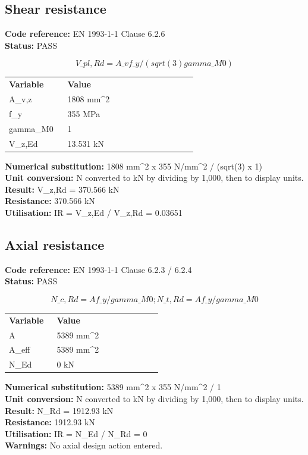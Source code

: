 \documentclass[11pt,a4paper]{article}
\begin{document}
\subsection{Shear resistance}
\textbf{Code reference:} EN 1993-1-1 Clause 6.2.6\\
\textbf{Status:} PASS

\[
V\_pl,Rd = A\_v f\_y / (sqrt(3) gamma\_M0)
\]

\begin{longtable}{p{0.28\linewidth}p{0.62\linewidth}}
\textbf{Variable} & \textbf{Value} \\
A\_v,z & 1808 mm\textasciicircum{}2 \\
f\_y & 355 MPa \\
gamma\_M0 & 1 \\
V\_z,Ed & 13.531 kN \\
\end{longtable}

\textbf{Numerical substitution:} 1808 mm\textasciicircum{}2 x 355 N/mm\textasciicircum{}2 / (sqrt(3) x 1)\\
\textbf{Unit conversion:} N converted to kN by dividing by 1,000, then to display units.\\
\textbf{Result:} V\_z,Rd = 370.566 kN\\
\textbf{Resistance:} 370.566 kN\\
\textbf{Utilisation:} IR = V\_z,Ed / V\_z,Rd = 0.03651\\


\subsection{Axial resistance}
\textbf{Code reference:} EN 1993-1-1 Clause 6.2.3 / 6.2.4\\
\textbf{Status:} PASS

\[
N\_c,Rd = A f\_y / gamma\_M0; N\_t,Rd = A f\_y / gamma\_M0
\]

\begin{longtable}{p{0.28\linewidth}p{0.62\linewidth}}
\textbf{Variable} & \textbf{Value} \\
A & 5389 mm\textasciicircum{}2 \\
A\_eff & 5389 mm\textasciicircum{}2 \\
N\_Ed & 0 kN \\
\end{longtable}

\textbf{Numerical substitution:} 5389 mm\textasciicircum{}2 x 355 N/mm\textasciicircum{}2 / 1\\
\textbf{Unit conversion:} N converted to kN by dividing by 1,000, then to display units.\\
\textbf{Result:} N\_Rd = 1912.93 kN\\
\textbf{Resistance:} 1912.93 kN\\
\textbf{Utilisation:} IR = N\_Ed / N\_Rd = 0\\
\textbf{Warnings:} No axial design action entered.
\end{document}
